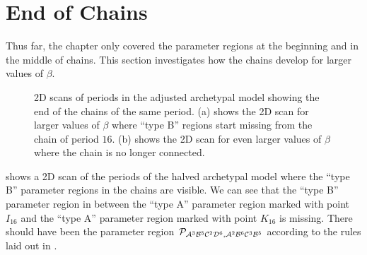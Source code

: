\section{End of Chains}
\label{sec:arch.end}

Thus far, the chapter only covered the parameter regions at the beginning and in the middle of chains.
This section investigates how the chains develop for larger values of $\beta$.

\begin{figure}
	\centering
	\caption[2D scans of periods in the archetypal model showing the end of the chains]{
		2D scans of periods in the adjusted archetypal model showing the end of the chains of the same period.
		(a) shows the 2D scan for larger values of $\beta$ where ``type B'' regions start missing from the chain of period $16$.
		(b) shows the 2D scan for even larger values of $\beta$ where the chain is no longer connected.
	}
\end{figure}

 shows a 2D scan of the periods of the halved archetypal model where the ``type B'' parameter regions in the chains are visible.
We can see that the ``type B'' parameter region in  between the ``type A'' parameter region marked with point $I_{16}$ and the ``type A'' parameter region marked with point $K_{16}$ is missing.
There should have been the parameter region $\mathcal{P}_{\mathcal{A}^3\mathcal{B}^5\mathcal{C}^2\mathcal{D}^6, \mathcal{A}^2\mathcal{B}^6\mathcal{C}^3\mathcal{B}^5}$ according to the rules laid out in .

